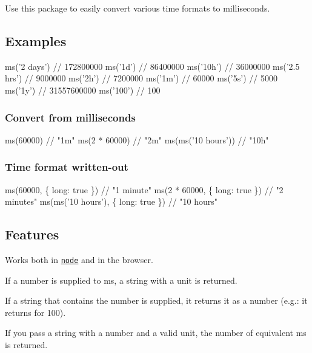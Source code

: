 \href{https://travis-ci.org/zeit/ms}{\tt } \href{https://github.com/sindresorhus/xo}{\tt } \href{https://zeit.chat/}{\tt }

Use this package to easily convert various time formats to milliseconds.

\subsection*{Examples}


\begin{DoxyCode}
ms('2 days')  // 172800000
ms('1d')      // 86400000
ms('10h')     // 36000000
ms('2.5 hrs') // 9000000
ms('2h')      // 7200000
ms('1m')      // 60000
ms('5s')      // 5000
ms('1y')      // 31557600000
ms('100')     // 100
\end{DoxyCode}


\subsubsection*{Convert from milliseconds}


\begin{DoxyCode}
ms(60000)             // "1m"
ms(2 * 60000)         // "2m"
ms(ms('10 hours'))    // "10h"
\end{DoxyCode}


\subsubsection*{Time format written-\/out}


\begin{DoxyCode}
ms(60000, \{ long: true \})             // "1 minute"
ms(2 * 60000, \{ long: true \})         // "2 minutes"
ms(ms('10 hours'), \{ long: true \})    // "10 hours"
\end{DoxyCode}


\subsection*{Features}


\begin{DoxyItemize}
\item Works both in \href{https://nodejs.org}{\tt node} and in the browser.
\item If a number is supplied to {\ttfamily ms}, a string with a unit is returned.
\item If a string that contains the number is supplied, it returns it as a number (e.\+g.\+: it returns {} for {\ttfamily \textquotesingle{}100\textquotesingle{}}).
\item If you pass a string with a number and a valid unit, the number of equivalent ms is returned.
\end{DoxyItemize}

